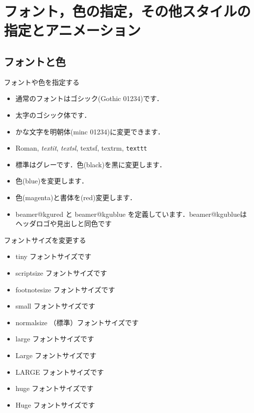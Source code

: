 \section{フォント，色の指定，その他スタイルの指定とアニメーション}

\subsection{フォントと色}

\begin{frame}{フォントや色を指定する}
  \begin{itemize}
    \item 通常のフォントはゴシック(Gothic 01234)です．
    \item {\bgoth 太字のゴシック体です．}
    \item {\minc かな文字を明朝体(minc 01234)に変更できます．}
    \item {\rm Roman}, \textit{textit}, \textsl{textsl}, \textsf{textsf}, \textrm{textrm}, \texttt{texttt}
    \item 標準はグレーです．{\color{black}色(black)を黒に変更します．}
    \item {\color{blue}色(blue)を変更します．}
    \item {\color{magenta}\bgoth 色(magenta)と書体を}{\color{red}\bgoth (red)変更します．}
    \item {\color{beamer@kgured}\bgoth beamer@kgured} と {\color{beamer@kgublue}\bgoth beamer@kgublue} を定義しています．{\color{beamer@kgublue}\bgoth beamer@kgublueはヘッダロゴや見出しと同色です}
  \end{itemize}
\end{frame}

\begin{frame}{フォントサイズを変更する}
  \begin{itemize}
    \item {\tiny tiny フォントサイズです}
    \item {\scriptsize scriptsize フォントサイズです}
    \item {\footnotesize footnotesize フォントサイズです}
    \item {\small small フォントサイズです}
    \item {\normalsize normalsize （標準）フォントサイズです}
    \item {\large large フォントサイズです}
    \item {\Large Large フォントサイズです}
    \item {\LARGE LARGE フォントサイズです}
    \item {\huge huge フォントサイズです}
    \item {\Huge Huge フォントサイズです}
  \end{itemize}
\end{frame}

